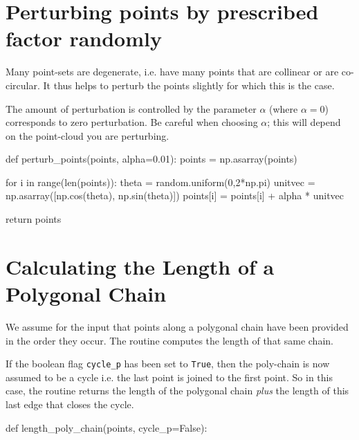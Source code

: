 \section{Perturbing points by prescribed factor randomly}

Many point-sets are degenerate, i.e. have many points that are collinear
or are co-circular. It thus helps to perturb the points slightly for which
this is the case. 

The amount of perturbation is controlled by the parameter $\alpha$ (where $\alpha=0$)
corresponds to zero perturbation. {\color{red} Be careful when choosing $\alpha$; this 
will depend on the point-cloud you are perturbing.}

\nwenddocs{}\plusendmoddef\nwstartdeflinemarkup{}\nwenddeflinemarkup
def perturb_points(points, alpha=0.01):
     points = np.asarray(points)

     for i in range(len(points)):
         theta     = random.uniform(0,2*np.pi)
         unitvec   = np.asarray([np.cos(theta), np.sin(theta)])
         points[i] = points[i] + alpha * unitvec

     return points
\nwendcode{}\nwdocspar


\section{Calculating the Length of a Polygonal Chain}

We assume for the input that points along a polygonal chain 
have been provided in the order they occur. The routine 
computes the length of that same chain. 

If the boolean flag  \verb|cycle_p| has been set to \verb|True|, 
then the poly-chain is now assumed to be a cycle i.e. the 
last point is joined to the first point. So in this case, the 
routine returns the length of the polygonal chain \textit{plus} the 
length of this last edge that closes the cycle. 


\nwenddocs{}\plusendmoddef\nwstartdeflinemarkup{}\nwenddeflinemarkup
def length_poly_chain(points, cycle_p=False):

